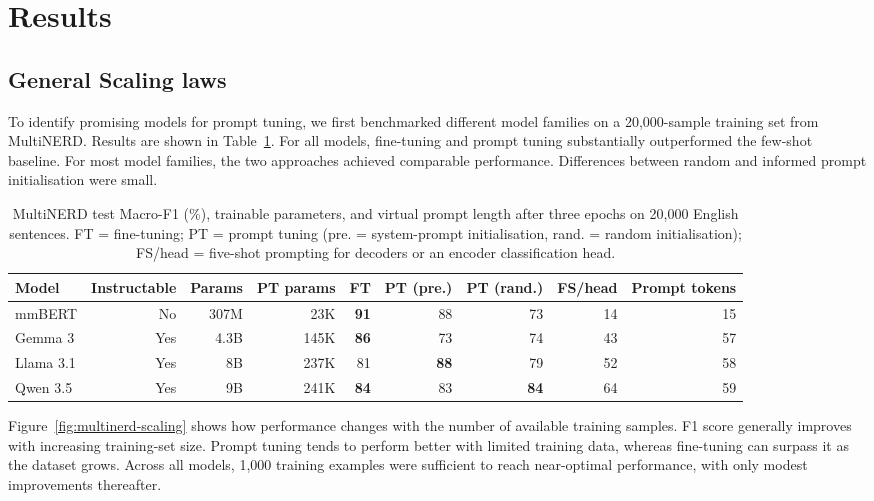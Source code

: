 \section{Results}

\subsection{General Scaling laws}

To identify promising models for prompt tuning, we first benchmarked
different model families on a 20,000-sample training set from
MultiNERD. Results are shown in Table~\ref{tab:multinerd}. For all
models, fine-tuning and prompt tuning substantially outperformed the
few-shot baseline. For most model families, the two approaches
achieved comparable performance. Differences between random and
informed prompt initialisation were small.

\begin{table}[ht]
  \centering
  \footnotesize
  \setlength{\tabcolsep}{4pt}
  \renewcommand{\arraystretch}{0.9}
  \caption{
    MultiNERD test Macro-F1 (\%), trainable parameters, and virtual
    prompt length after three epochs on 20,000 English sentences. FT
    = fine-tuning; PT = prompt tuning (pre. = system-prompt
    initialisation, rand. = random initialisation); FS/head =
    five-shot prompting for decoders or an encoder classification
    head. %
  }
  \label{tab:multinerd}
  \begin{tabular}{lrrrrrrrr}
    \toprule
    Model     & Instructable & Params & PT params & FT          & PT (pre.)   & PT (rand.)  & FS/head & Prompt tokens \\
    \midrule
    mmBERT    & No           & 307M   & 23K       & \textbf{91} & 88          & 73          & 14      & 15 \\
    Gemma 3   & Yes          & 4.3B   & 145K      & \textbf{86} & 73          & 74          & 43      & 57 \\
    Llama 3.1 & Yes          & 8B     & 237K      & 81          & \textbf{88} & 79          & 52      & 58 \\
    Qwen 3.5  & Yes          & 9B     & 241K      & \textbf{84} & 83          & \textbf{84} & 64      & 59 \\
    \bottomrule
  \end{tabular}
\end{table}

Figure~\ref{fig:multinerd-scaling} shows how performance changes with
the number of available training samples. F1 score generally improves
with increasing training-set size. Prompt tuning tends to perform
better with limited training data, whereas fine-tuning can surpass it
as the dataset grows. Across all models, 1,000 training examples were
sufficient to reach near-optimal performance, with only modest
improvements thereafter.


